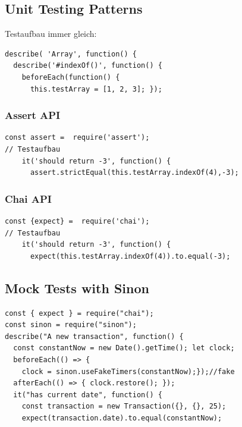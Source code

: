 \subsection{Unit Testing Patterns}




Testaufbau immer gleich:
\begin{lstlisting} 
describe( 'Array', function() {
  describe('#indexOf()', function() {
    beforeEach(function() {
      this.testArray = [1, 2, 3]; });
\end{lstlisting}
\subsubsection{Assert API}
\begin{lstlisting}
const assert =  require('assert');
// Testaufbau
    it('should return -3', function() {
      assert.strictEqual(this.testArray.indexOf(4),-3);
\end{lstlisting}
\subsubsection{Chai API}
\begin{lstlisting}
const {expect} =  require('chai');
// Testaufbau
    it('should return -3', function() {
      expect(this.testArray.indexOf(4)).to.equal(-3);
\end{lstlisting}


\subsection{Mock Tests with Sinon}
\begin{lstlisting}
const { expect } = require("chai");
const sinon = require("sinon");
describe("A new transaction", function() { 
  const constantNow = new Date().getTime(); let clock;
  beforeEach(() => {
    clock = sinon.useFakeTimers(constantNow);});//fake
  afterEach(() => { clock.restore(); });
  it("has current date", function() { 
    const transaction = new Transaction({}, {}, 25); 
    expect(transaction.date).to.equal(constantNow);
\end{lstlisting}


